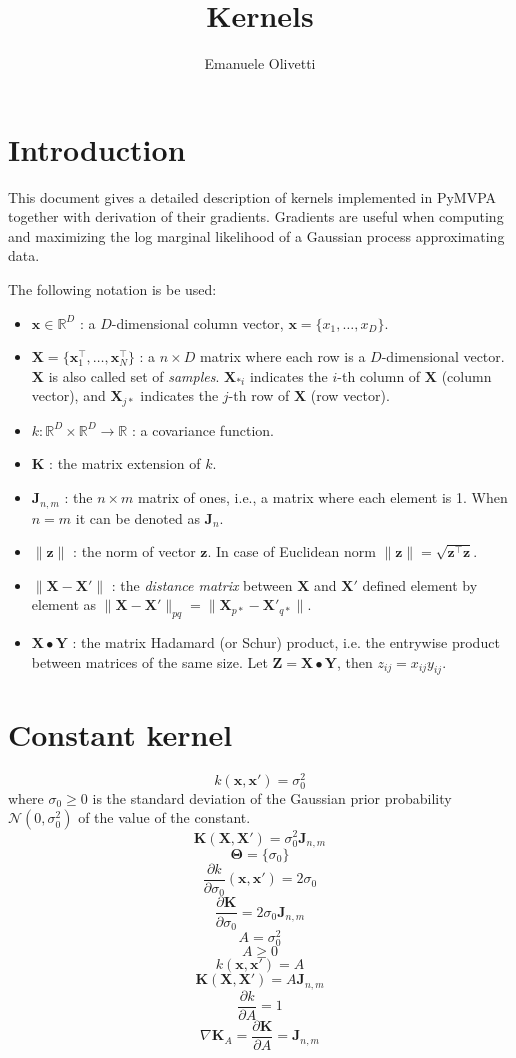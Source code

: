 \documentclass[a4paper,11pt]{article}
\title{Kernels}
\author{Emanuele Olivetti}
\newcommand\R{{\mathbb R}}
\newcommand\x{{\mathbf x}}
\newcommand\X{{\mathbf X}}
\newcommand\K{{\mathbf K}}
\newcommand\J{{\mathbf J}}
\begin{document}
\maketitle

\section{Introduction}
This document gives a detailed description of kernels implemented in
PyMVPA together with derivation of their gradients. Gradients are
useful when computing and maximizing the log marginal likelihood of a
Gaussian process approximating data.

The following notation is be used:
\begin{itemize}
\item $\x \in \R^D$ : a $D$-dimensional column vector, $\x =
  \{x_1,\ldots,x_D\}$.
\item $\X = \{\x_1^{\top},\ldots,\x_N^{\top}\}$ : a $n \times D$
  matrix where each row is a $D$-dimensional vector. $\X$ is also
  called set of \emph{samples}. $\X_{* i}$ indicates the $i$-th
  column of $\X$ (column vector), and $\X_{j *}$ indicates the
  $j$-th row of $\X$ (row vector).
\item $k: \R^D \times \R^D \rightarrow \R$ : a covariance function.
\item $\K$ : the matrix extension of $k$.
\item $\J_{n,m}$ : the $n \times m$ matrix of ones, i.e., a matrix
  where each element is 1. When $n = m$ it can be denoted as $\J_n$.
\item $\|\mathbf{z}\|$ : the norm of vector $\mathbf{z}$. In case of
  Euclidean norm $\|\mathbf{z}\| =
  \sqrt{\mathbf{z}^{\top}\mathbf{z}}$.
\item $\|\X-\X'\|$ : the \emph{distance matrix} between $\X$ and $\X'$
  defined element by element as $\|\X-\X'\|_{pq} = \|\X_{p *} -
  \X'_{q *}\|$.
\item $\X \bullet \mathbf{Y}$ : the matrix Hadamard (or Schur)
  product, i.e. the entrywise product between matrices of the same
  size. Let $\mathbf{Z} = \X \bullet \mathbf{Y}$, then $z_{ij} =
  x_{ij} y_{ij}$.
\end{itemize}

\section{Constant kernel}
$$k(\x,\x') = \sigma_0^2$$
where $\sigma_0 \ge 0$ is the standard deviation of the Gaussian prior
probability $\mathcal{N}(0,\sigma_0^2)$ of the value of the constant.
$$\K(\X,\X') = \sigma_0^2 \J_{n,m}$$
$$\mathbf{\Theta} = \{\sigma_0\}$$
$$\frac{\partial k}{\partial \sigma_0}(\x,\x') = 2\sigma_0$$
$$\frac{\partial \K}{\partial \sigma_0} = 2\sigma_0 \J_{n,m}$$
$$A = \sigma_0^2$$
$$A \ge 0$$
$$k(\x,\x') = A$$
$$\K(\X,\X') = A \J_{n,m}$$
$$\frac{\partial k}{\partial A} = 1$$
$$\nabla \K_A = \frac{\partial \K}{\partial A} = \J_{n,m}$$
\end{document}
